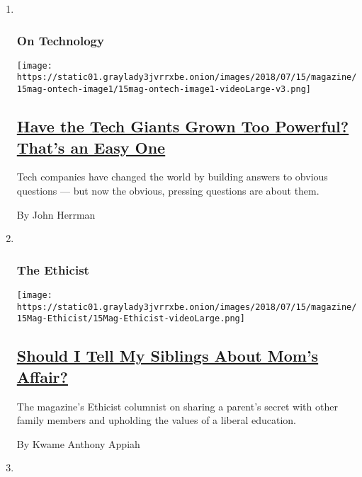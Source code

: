 \begin{enumerate}
\def\labelenumi{\arabic{enumi}.}
\item ~
  \hypertarget{on-technology}{%
  \subsubsection{On Technology}\label{on-technology}}

  \texttt{[image: https://static01.graylady3jvrrxbe.onion/images/2018/07/15/magazine/15mag-ontech-image1/15mag-ontech-image1-videoLarge-v3.png]}

  \hypertarget{have-the-tech-giants-grown-too-powerful-thats-an-easy-one}{%
  \subsection{\texorpdfstring{\href{/2018/07/11/magazine/facebook-google-uber-tech-giants-power.html}{Have
  the Tech Giants Grown Too Powerful? That's an Easy
  One}}{Have the Tech Giants Grown Too Powerful? That's an Easy One}}\label{have-the-tech-giants-grown-too-powerful-thats-an-easy-one}}

  Tech companies have changed the world by building answers to obvious
  questions --- but now the obvious, pressing questions are about them.

  By John Herrman
\item ~
  \hypertarget{the-ethicist}{%
  \subsubsection{The Ethicist}\label{the-ethicist}}

  \texttt{[image: https://static01.graylady3jvrrxbe.onion/images/2018/07/15/magazine/15Mag-Ethicist/15Mag-Ethicist-videoLarge.png]}

  \hypertarget{should-i-tell-my-siblings-about-moms-affair}{%
  \subsection{\texorpdfstring{\href{/2018/07/10/magazine/should-i-tell-my-siblings-about-moms-affair.html}{Should
  I Tell My Siblings About Mom's
  Affair?}}{Should I Tell My Siblings About Mom's Affair?}}\label{should-i-tell-my-siblings-about-moms-affair}}

  The magazine's Ethicist columnist on sharing a parent's secret with
  other family members and upholding the values of a liberal education.

  By Kwame Anthony Appiah
\item ~
  \hypertarget{letter-of-recommendation}{%
}
\end{enumerate}
